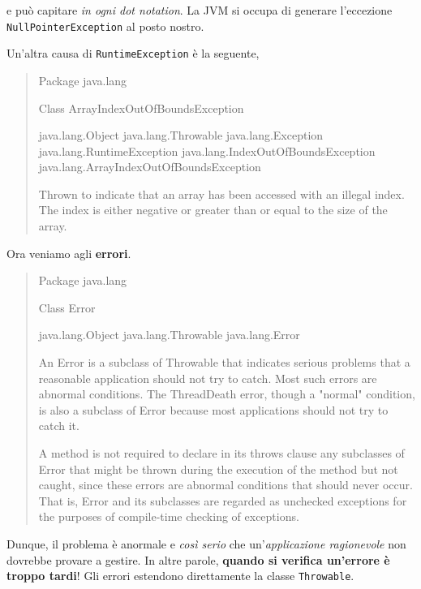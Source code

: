 \documentclass[\fontsizeclass,twocolumn]{\classname}
\theoremstyle{definition}
\theoremstyle{definition}
\begin{document}
e può capitare \emph{in ogni dot notation}. La JVM si occupa di generare
l'eccezione \texttt{NullPointer\-Exception} al posto nostro.

Un'altra causa di \texttt{Runtime\-Exception} è la seguente,
\begin{quote}
    \footnotesize{Package java.lang

Class ArrayIndexOutOf\-BoundsException

java.lang.Object
java.lang.Throwable
java.lang.Exception
java.lang.Runtime\-Exception
java.lang.IndexOutOfBoundsException
java.lang.ArrayIndexOutOf\-BoundsException

Thrown to indicate that an array has been accessed with an illegal index. The
index is either negative or greater than or equal to the size of the array.
}
\end{quote}

Ora veniamo agli \textbf{errori}.
\begin{quote}
    \footnotesize{Package java.lang

Class Error

java.lang.Object
java.lang.Throwable
java.lang.Error

An Error is a subclass of Throwable that indicates serious problems that a
reasonable application should not try to catch. Most such errors are abnormal
conditions. The ThreadDeath error, though a "normal" condition, is also a
subclass of Error because most applications should not try to catch it.

A method is not required to declare in its throws clause any subclasses of
Error that might be thrown during the execution of the method but not caught,
since these errors are abnormal conditions that should never occur. That is,
Error and its subclasses are regarded as unchecked exceptions for the purposes
of compile-time checking of exceptions.
}
\end{quote}

Dunque, il problema è anormale e \emph{così serio} che un'\emph{applicazione
ragionevole} non dovrebbe provare a gestire. In altre parole, \textbf{quando si
verifica un'errore è troppo tardi}! Gli errori estendono direttamente la classe
\texttt{Throwable}.
\end{document}
